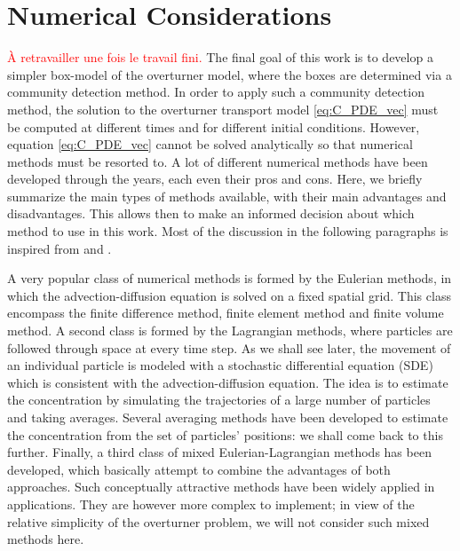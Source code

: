 \chapter{Numerical Considerations}
\textcolor{red}{À retravailler une fois le travail fini.}
The final goal of this work is to develop a simpler box-model of the overturner model, where the boxes are determined via a community detection method. In order to apply such a community detection method, the solution to the overturner transport model \eqref{eq:C_PDE_vec} must be computed at different times and for different initial conditions. However, equation \eqref{eq:C_PDE_vec} cannot be solved analytically so that numerical methods must be resorted to. A lot of different numerical methods have been developed through the years, each even their pros and cons. Here, we briefly summarize the main types of methods available, with their main advantages and disadvantages. This allows then to make an informed decision about which method to use in this work. Most of the discussion in the following paragraphs is inspired from \cite{spivakovskaya2007lagrangian} and \cite{spivakovskaya2007backward}. 

A very popular class of numerical methods is formed by the Eulerian methods, in which the advection-diffusion equation is solved on a fixed spatial grid. This class encompass the finite difference method, finite element method and finite volume method. A second class is formed by the Lagrangian methods, where particles are followed through space at every time step. As we shall see later, the movement of an individual particle is modeled with a stochastic differential equation (SDE) which is consistent with the advection-diffusion equation. The idea is to estimate the concentration by simulating the trajectories of a large number of particles and taking averages. Several averaging methods have been developed to estimate the concentration from the set of particles' positions: we shall come back to this further. Finally, a third class of mixed Eulerian-Lagrangian methods has been developed, which basically attempt to combine the advantages of both approaches. Such conceptually attractive methods have been widely applied in applications. They are however more complex to implement; in view of the relative simplicity of the overturner problem, we will not consider such mixed methods here.

